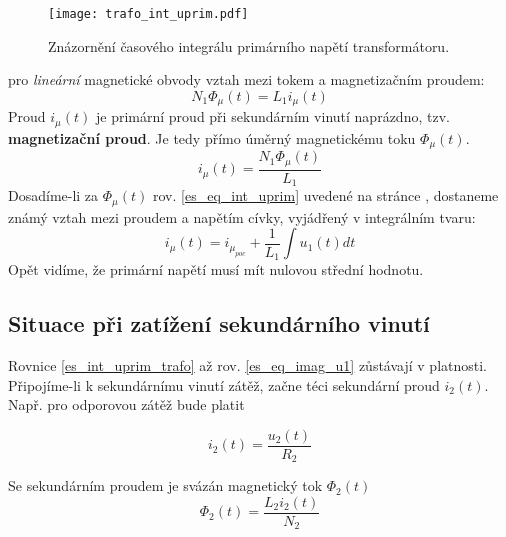       \begin{figure}[ht!]
        \centering
        \texttt{[image: trafo\_int\_uprim.pdf]}
        \caption{Znázornění časového integrálu primárního napětí transformátoru.}
        \label{es:fig_trafo_int_uprim}
      \end{figure}

      pro \emph{lineární} magnetické obvody vztah mezi tokem a magnetizačním proudem:
      \begin{equation}\label{es_eq_stat_def_L}
        N_1\Phi_\mu(t)=L_1i_\mu(t)
      \end{equation}
      Proud $i_\mu(t)$ je primární proud při sekundárním vinutí naprázdno, tzv. \textbf{magnetizační proud}. 
      Je tedy přímo úměrný magnetickému toku $\Phi_\mu(t)$.
      \begin{equation}\label{es_eq_imag}
        i_\mu(t)=\frac{N_1\Phi_\mu(t)}{L_1}
      \end{equation}
      Dosadíme-li za $\Phi_\mu(t)$ rov. \ref{es_eq_int_uprim} uvedené na stránce \pageref{es_eq_int_uprim}, 
      dostaneme známý vztah mezi proudem a napětím cívky, vyjádřený v
      integrálním tvaru:
      \begin{equation}\label{es_eq_imag_u1}
        i_\mu(t)=i_{\mu_{poc}}+\frac{1}{L_1}\int{u_1(t)dt}
      \end{equation}
      Opět vidíme, že primární napětí musí mít nulovou střední hodnotu.
      
    \subsection{Situace při zatížení sekundárního vinutí}
      Rovnice \ref{es_int_uprim_trafo} až rov. \ref{es_eq_imag_u1} zůstávají v platnosti. Připojíme-li k 
      sekundárnímu vinutí zátěž, začne téci sekundární proud $i_2(t)$. Např. pro odporovou zátěž bude platit

      \begin{equation}\label{es:eq_i2}
        i_2(t)=\frac{u_2(t)}{R_2}
      \end{equation}

      Se sekundárním proudem je svázán magnetický tok $\Phi_2(t)$
      \begin{equation}\label{es:eq_tok_phi2}
        \Phi_2(t)=\frac{L_2i_2(t)}{N_2}
      \end{equation}
    
